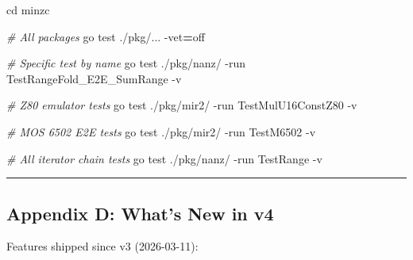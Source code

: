 \documentclass[
  11pt,
]{article}
\newenvironment{Shaded}{\begin{snugshade}}{\end{snugshade}}
\newcommand{\AttributeTok}[1]{\textcolor[rgb]{0.13,0.29,0.53}{#1}}
\newcommand{\BuiltInTok}[1]{#1}
\newcommand{\CommentTok}[1]{\textcolor[rgb]{0.56,0.35,0.01}{\textit{#1}}}
\newcommand{\ExtensionTok}[1]{#1}
\newcommand{\NormalTok}[1]{#1}
\newcommand{\OperatorTok}[1]{\textcolor[rgb]{0.81,0.36,0.00}{\textbf{#1}}}
\begin{document}
\begin{Shaded}
\begin{Highlighting}[]
\BuiltInTok{cd}\NormalTok{ minzc}

\CommentTok{\# All packages}
\ExtensionTok{go}\NormalTok{ test ./pkg/... }\AttributeTok{{-}vet}\OperatorTok{=}\NormalTok{off}

\CommentTok{\# Specific test by name}
\ExtensionTok{go}\NormalTok{ test ./pkg/nanz/ }\AttributeTok{{-}run}\NormalTok{ TestRangeFold\_E2E\_SumRange }\AttributeTok{{-}v}

\CommentTok{\# Z80 emulator tests}
\ExtensionTok{go}\NormalTok{ test ./pkg/mir2/ }\AttributeTok{{-}run}\NormalTok{ TestMulU16ConstZ80 }\AttributeTok{{-}v}

\CommentTok{\# MOS 6502 E2E tests}
\ExtensionTok{go}\NormalTok{ test ./pkg/mir2/ }\AttributeTok{{-}run}\NormalTok{ TestM6502 }\AttributeTok{{-}v}

\CommentTok{\# All iterator chain tests}
\ExtensionTok{go}\NormalTok{ test ./pkg/nanz/ }\AttributeTok{{-}run}\NormalTok{ TestRange }\AttributeTok{{-}v}
\end{Highlighting}
\end{Shaded}

\begin{center}\rule{0.5\linewidth}{0.5pt}\end{center}

\hypertarget{appendix-d-whats-new-in-v4}{%
\subsection{Appendix D: What's New in
v4}\label{appendix-d-whats-new-in-v4}}

Features shipped since v3 (2026-03-11):
\end{document}
